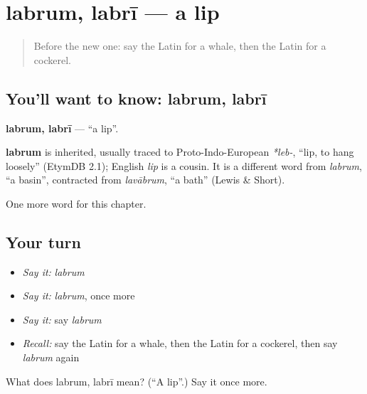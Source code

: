 \section[labrum, labrī]{labrum, labrī — a lip}

\label{lesson:LA-C135-labrum}



\begin{quote}
Before the new one: say the Latin for a whale, then the Latin for a cockerel.
\end{quote}

\subsection*{You'll want to know: labrum, labrī}
\textbf{labrum, labrī} — \textquotedblleft{}a lip\textquotedblright{}.

\begin{cousinweb}
\textbf{labrum} is inherited, usually traced to Proto-Indo-European \emph{*leb-}, \textquotedblleft{}lip, to hang loosely\textquotedblright{} (EtymDB 2.1); English \emph{lip} is a cousin. It is a different word from \emph{labrum}, \textquotedblleft{}a basin\textquotedblright{}, contracted from \emph{lavābrum}, \textquotedblleft{}a bath\textquotedblright{} (Lewis \& Short).
\end{cousinweb}

\begin{grammarlens}[title={What you've built}]
One more word for this chapter.
\end{grammarlens}

\subsection*{Your turn}
\begin{itemize}
\raggedright
  \item \emph{Say it:} \emph{labrum}
  \item \emph{Say it:} \emph{labrum}, once more
  \item \emph{Say it:} say \emph{labrum}
  \item \emph{Recall:} say the Latin for a whale, then the Latin for a cockerel, then say \emph{labrum} again
\end{itemize}

\begin{tcolorbox}[breakable,colback=teal!4,colframe=teal!35!black,title={Before you move on}]
What does labrum, labrī mean? (\textquotedblleft{}A lip\textquotedblright{}.) Say it once more.
\end{tcolorbox}
